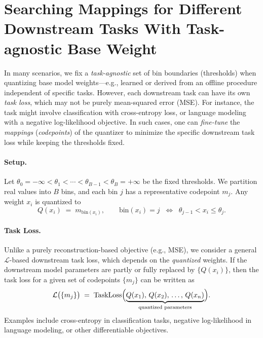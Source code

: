 
\section{Searching Mappings for Different Downstream Tasks With Task-agnostic Base Weight} \label{app:stemappingsearch}

In many scenarios, we fix a \emph{task-agnostic} set of bin boundaries (thresholds) when quantizing base model weights---e.g., learned or derived from an offline procedure independent of specific tasks. 
However, each downstream task can have its own \emph{task loss}, which may not be purely mean-squared error (MSE). For instance, the task might involve classification with cross-entropy loss, or language modeling with a negative log-likelihood objective. 
In such cases, one can \emph{fine-tune} the \emph{mappings} (\emph{codepoints}) of the quantizer to minimize the specific downstream task loss while keeping the thresholds fixed.

\paragraph{Setup.} Let 
\(
  \theta_0 = -\infty < \theta_1 < \cdots < \theta_{B-1} < \theta_B = +\infty
\)
be the fixed thresholds. We partition real values into \(B\) bins, and each bin \(j\) has a representative codepoint \(m_j\). 
Any weight \(x_i\) is quantized to
\[
   Q(x_i) \;=\; m_{\mathrm{bin}(x_i)},
   \qquad
   \mathrm{bin}(x_i) = j 
   \;\;\Longleftrightarrow\;\;
   \theta_{j-1} < x_i \le \theta_j.
\]

\paragraph{Task Loss.} 
Unlike a purely reconstruction-based objective (e.g., MSE), we consider a general \(\mathcal{L}\)-based downstream task loss, which depends on the \emph{quantized} weights. If the downstream model parameters are partly or fully replaced by \(\{Q(x_i)\}\), then the task loss for a given set of codepoints \(\{m_j\}\) can be written as
\[
   \mathcal{L}\bigl(\{m_j\}\bigr)
   \;=\; 
   \text{TaskLoss}\Bigl(\underbrace{Q(x_1), \,Q(x_2), \,\dots,\, Q(x_n)}_{\text{quantized parameters}}\Bigr).
\]
Examples include cross-entropy in classification tasks, negative log-likelihood in language modeling, or other differentiable objectives.


